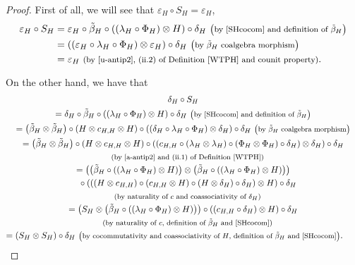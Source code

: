 \documentclass[pdftex]{sigma}
\numberwithin{equation}{section}
\begin{document}
\begin{proof}
First of all, we will see that $\varepsilon_{H}\circ S_{H}=\varepsilon_{H}$,
\begin{align*}
\varepsilon_{H}\circ S_{H}
={}&\varepsilon_{H}\circ\tilde{\beta}_{H}\circ((\lambda_{H}\circ\Phi_{H})\otimes H)\circ\delta_{H}\ \text{\footnotesize\textnormal{\big(by \eqref{SHcocom} and definition of $\tilde{\beta}_{H}$\big)}}\\
={}&((\varepsilon_{H}\circ\lambda_{H}\circ\Phi_{H})\otimes\varepsilon_{H})\circ\delta_{H}\ \text{\footnotesize\textnormal{\big(by $\tilde{\beta}_{H}$ coalgebra morphism\big)}}\\
={}&\varepsilon_{H}\ \text{\footnotesize\textnormal{(by \eqref{u-antip2}, (ii.2) of Definition \ref{WTPH} and counit property)}}.
\end{align*}

On the other hand, we have that
\begin{gather*}
 \delta_{H}\circ S_{H}\\
 = \delta_{H}\circ\tilde{\beta}_{H}\circ((\lambda_{H}\circ\Phi_{H})\otimes H)\circ\delta_{H}\ \text{\footnotesize\textnormal{\big(by \eqref{SHcocom} and definition of $\tilde{\beta}_{H}$\big)}}\\
 = \bigl(\tilde{\beta}_{H}\otimes \tilde{\beta}_{H}\bigr)\circ(H\otimes c_{H,H}\otimes H)\circ((\delta_{H}\circ\lambda_{H}\circ\Phi_{H})\otimes\delta_{H})\circ\delta_{H}\ \text{\footnotesize\textnormal{\big(by $\tilde{\beta}_{H}$ coalgebra morphism\big)}}\\
 = \bigl(\tilde{\beta}_{H}\otimes \tilde{\beta}_{H}\bigr)\circ(H\otimes c_{H,H}\otimes H)\circ((c_{H,H}\circ(\lambda_{H}\otimes\lambda_{H})\circ(\Phi_{H}\otimes\Phi_{H})\circ\delta_{H} )\otimes\delta_{H})\circ\delta_{H}\\
 \quad{} \text{\footnotesize\textnormal{(by \eqref{a-antip2} and (ii.1) of Definition \ref{WTPH})}}\\
 = \bigl(\bigl(\tilde{\beta}_{H}\circ((\lambda_{H}\circ\Phi_{H})\otimes H)\bigr)\otimes\bigl(\tilde{\beta}_{H}\circ((\lambda_{H}\circ\Phi_{H})\otimes H)\bigr)\bigr)\\
 \quad{} \circ(((H\otimes c_{H,H})\circ(c_{H,H}\otimes H)\circ(H\otimes\delta_{H})\circ\delta_{H})\otimes H)\circ\delta_{H}\\
 \quad{} \text{\footnotesize\textnormal{(by naturality of $c$ and coassociativity of $\delta_{H}$)}}\\
 = \bigl(S_{H}\otimes\bigl(\tilde{\beta}_{H}\circ((\lambda_{H}\circ\Phi_{H})\otimes H)\bigr)\bigr)\circ((c_{H,H}\circ\delta_{H})\otimes H)\circ\delta_{H}\\
 \quad{} \text{\footnotesize\textnormal{(by naturality of $c$, definition of $\tilde{\beta}_{H}$ and \eqref{SHcocom})}}\\
 = (S_{H}\otimes S_{H})\circ\delta_{H}\ \text{\footnotesize\textnormal{\big(by cocommutativity and coassociativity of $H$, definition of $\tilde{\beta}_{H}$ and \eqref{SHcocom}\big)}}.\tag*{\qed}
\end{gather*}
\renewcommand{\qed}{}
\end{proof}
\end{document}
